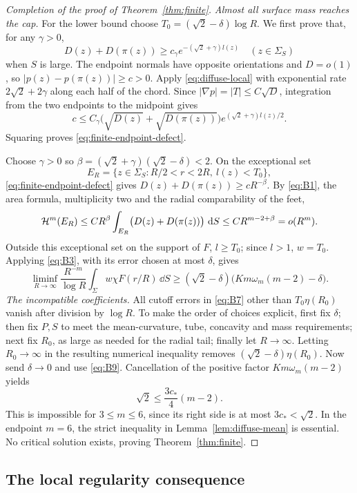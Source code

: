 \begin{proof}[Completion of the proof of Theorem~\ref{thm:finite}]
\emph{Almost all surface mass reaches the cap.}
For the lower bound choose
\(T_0=(\sqrt2-\delta)\log R\).
We first prove that, for any \(\gamma>0\),
\begin{equation}\label{eq:finite-endpoint-defect}
 D(z)+D(\pi(z))\ge c_\gamma
                    e^{-(\sqrt2+\gamma)l(z)}
 \quad(z\in\Sigma_S)
\end{equation}
when \(S\) is large.
The endpoint normals have opposite orientations and \(D=o(1)\), so
\(|p(z)-p(\pi(z))|\ge c>0\).
Apply \eqref{eq:diffuse-local} with exponential rate
\(2\sqrt2+2\gamma\) along each half of the chord.  Since
\(|\nabla p|=|T|\le C\sqrt D\), integration from the two endpoints
to the midpoint gives
\[
 c\le C_\gamma
       \bigl(\sqrt{D(z)}+\sqrt{D(\pi(z))}\bigr)
        e^{(\sqrt2+\gamma)l(z)/2}.
\]
Squaring proves \eqref{eq:finite-endpoint-defect}.

Choose \(\gamma>0\) so
\(\beta=(\sqrt2+\gamma)(\sqrt2-\delta)<2\).
On the exceptional set
\[
 E_R=\{z\in\Sigma_S:R/2<r<2R,\ l(z)<T_0\},
\]
\eqref{eq:finite-endpoint-defect} gives
\(D(z)+D(\pi(z))\ge cR^{-\beta}\).
By \eqref{eq:B1}, the area formula, multiplicity two and the radial
comparability of the feet,
\[
 \mathcal H^m(E_R)
 \le CR^\beta\int_{E_R}\bigl(D(z)+D(\pi(z))\bigr)\,\,\mathrm d S
 \le CR^{m-2+\beta}=o(R^m).
\]
Outside this exceptional set on the support of \(F\), \(l\ge T_0\);
since \(l>1\), \(w=T_0\).  Applying \eqref{eq:B3}, with its error
chosen at most \(\delta\), gives
\[
 \liminf_{R\to\infty}\frac{R^{-m}}{\log R}
       \int_\Sigma w\chi F(r/R)\,\dd S
 \ge(\sqrt2-\delta)\bigl(Km\omega_m(m-2)-\delta\bigr).
\]
\emph{The incompatible coefficients.}
All cutoff errors in \eqref{eq:B7} other than \(T_0\eta(R_0)\)
vanish after division by \(\log R\).
To make the order of choices explicit, first fix \(\delta\);
then fix \(P,S\) to meet the mean-curvature, tube, concavity and mass
requirements; next fix \(R_0\), as large as needed for the radial
tail; finally let \(R\to\infty\).
Letting \(R_0\to\infty\) in the resulting numerical inequality
removes \((\sqrt2-\delta)\eta(R_0)\).
Now send \(\delta\to0\) and use \eqref{eq:B9}.  Cancellation of the
positive factor \(K m\omega_m(m-2)\) yields
\[
 \sqrt2\le \frac{3c_*}{4}(m-2).
\]
This is impossible for \(3\le m\le6\), since its right side is at most
\(3c_*<\sqrt2\).  In the endpoint \(m=6\), the strict inequality in
Lemma~\ref{lem:diffuse-mean} is essential.
No critical solution exists, proving Theorem~\ref{thm:finite}.
\end{proof}

\subsection{The local regularity consequence}

